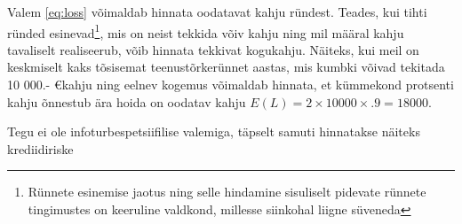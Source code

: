 \documentclass{article}
\begin{document}
Valem \ref{eq:loss} võimaldab hinnata oodatavat kahju ründest. Teades, kui tihti ründed esinevad\footnote{Rünnete esinemise jaotus ning selle hindamine sisuliselt pidevate rünnete tingimustes on keeruline valdkond, millesse siinkohal liigne süveneda}, mis on neist tekkida võiv kahju ning mil määral kahju tavaliselt realiseerub, võib hinnata tekkivat kogukahju. Näiteks, kui meil on keskmiselt kaks tõsisemat teenustõrkerünnet aastas, mis kumbki võivad tekitada 10 000.- \euro kahju ning eelnev kogemus võimaldab hinnata, et kümmekond protsenti kahju õnnestub ära hoida on oodatav kahju $E(L)=2 \times 10000 \times .9 = 18 000$. 

Tegu ei ole infoturbespetsiifilise valemiga, täpselt samuti hinnatakse näiteks krediidiriske


\nocite{*}

 
\end{document}
